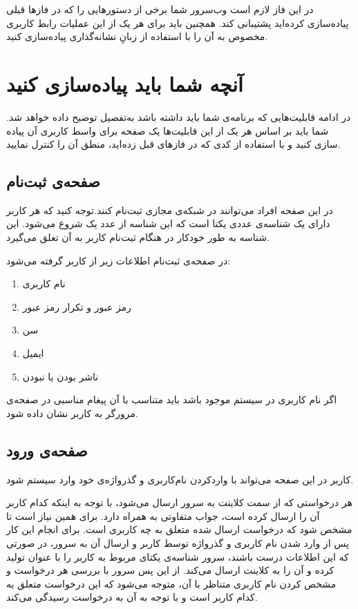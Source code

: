 \documentclass{utap}
\begin{document}
		در این فاز لازم است وب‌سرور شما برخی از دستورهایی را که در فازها قبلی پیادەسازی کردەاید پشتیبانی کند. همچنین باید برای هر یک از این عملیات رابط کاربری مخصوص به آن را با استفاده از زبانِ نشانه‌گذاری  پیادەسازی کنید.

	\section{آنچه‌ شما باید پیاده‌سازی کنید}
	
در ادامه قابلیت‌هایی که برنامه‌ی شما باید داشته باشد به‌تفصیل توضیح داده خواهد شد. شما باید بر اساس هر یک از این قابلیت‌ها یک صفحه برای واسط کاربری آن پیاده سازی کنید و با استفاده از کدی که در فازهای قبل زدەاید، منطق آن را کنترل نمایید.
	
	\subsection{صفحه‌ی ثبت‌نام}
	
	در این صفحه افراد می‌توانند در شبکه‌ی مجازی ثبت‌نام کنند.توجه کنید که هر کاربر دارای یک شناسه‌ی عددی یکتا است که این شناسه از عدد یک شروع می‌شود. این شناسه به طور خودکار در هنگام ثبت‌نام کاربر به آن تعلق می‌گیرد.  
	
	در صفحه‌ی ثبت‌نام اطلاعات زیر از کاربر گرفته می‌شود‌:‌
	\begin{enumerate}
		\item نام ‌کاربری
		\item رمز عبور و تکرار رمز عبور
		\item سن
		\item ایمیل
		\item ناشر بودن یا نبودن
	\end{enumerate}
	
	اگر نام کاربری در سیستم موجود باشد باید متناسب با آن پیغام مناسبی در صفحه‌ی مرورگر به کاربر نشان داده شود.
	
		
	\subsection{صفحه‌ی ورود}
	کاربر در این صفحه می‌تواند با واردکردن نام‌کاربری و گذرواژەی خود وارد سیستم شود. 
	
	هر درخواستی که از سمت کلاینت به سرور ارسال می‌شود، با توجه به اینکه کدام کاربر آن را ارسال کرده است، جواب متفاوتی به همراه دارد. برای همین نیاز است تا مشخص شود که درخواست ارسال شده متعلق به چه کاربری است. برای انجام این کار پس از وارد شدن نام‌ کاربری و گذرواژه توسط کاربر و ارسال آن به سرور، در صورتی که این اطلاعات درست باشند، سرور شناسه‌ی یکتای مربوط به کاربر را با عنوان  تولید کرده و آن را به کلاینت ارسال می‌کند. از این پس سرور با بررسی  هر درخواست و مشخص کردن نام کاربری متناظر با آن، متوجه می‌شود که این درخواست متعلق به کدام کاربر است و با توجه به آن به درخواست رسیدگی می‌کند.
	
\end{document}
